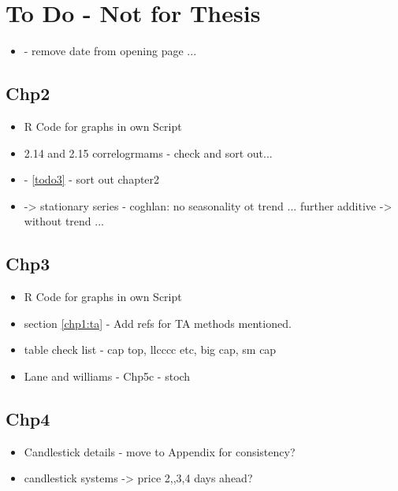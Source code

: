 
\chapter{To Do - Not for Thesis} %

\label{Chapter7} %




\begin{itemize}
\item - remove date from opening page ...
\end{itemize}

\section{Chp2}
\begin{itemize}
\item R Code for graphs in own Script
\item 2.14 and 2.15 correlogrmams - check and sort out...
\item - \ref{todo3} - sort out chapter2
\item -> stationary series - coghlan: no seasonality ot trend ...  further additive -> without trend ...
\end{itemize}

\section{Chp3}
\begin{itemize}
\item R Code for graphs in own Script
\item section \ref{chp1:ta} - Add refs for TA methods mentioned.
\item table check list - cap top, llcccc etc, big cap, sm cap
\item Lane \cite{lane1986using} and williams \cite{williams2011long} \cite{williams1989definitive} - Chp5c - stoch
\end{itemize}

\section{Chp4}
\begin{itemize}
\item Candlestick details - move to Appendix for consistency?
\item candlestick systems -> price 2,,3,4 days ahead?
\end{itemize}

